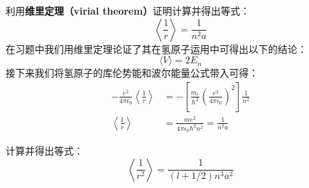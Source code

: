 \begin{exercise}{}\label{HfineS_exe1}
利用\textbf{维里定理（virial theorem）}证明计算并得出等式：
\begin{equation}
\left\langle\frac{1}{r}\right\rangle = \frac{1}{n^2a}
\end{equation}
在习题中我们用维里定理论证了其在氢原子运用中可得出以下的结论：
\begin{equation}
\langle V\rangle =2E_n
\end{equation}
接下来我们将氢原子的库伦势能和波尔能量公式带入可得：
\begin{align}
-\frac{e^2}{4\pi\epsilon_0}\left\langle \frac{1}{r}\right\rangle&=-\left[\frac {m_e}{\hbar^{2}} \left(\frac {e^ {2}}{4\pi \epsilon_0}\right)^ {2}\right]  \frac {1}{n^ {2}}\\
\left\langle \frac{1}{r}\right\rangle&=\frac{me^2}{4\pi\epsilon_0\hbar^2n^2}=\frac{1}{n^2a}
\end{align}


\end{exercise}
\begin{exercise}{}\label{HfineS_exe2}
计算并得出等式：
\begin{equation}
\left\langle \frac{1}{r^2}\right\rangle = \frac{1}{(l+1/2)n^3a^2}
\end{equation}
\end{exercise}

